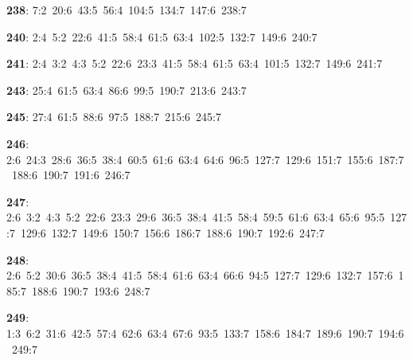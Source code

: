 \noindent \textbf{238}: 7:2\allowbreak\ 20:6\allowbreak\ 43:5\allowbreak\ 56:4\allowbreak\ 104:5\allowbreak\ 134:7\allowbreak\ 147:6\allowbreak\ 238:7\par
\noindent \textbf{240}: 2:4\allowbreak\ 5:2\allowbreak\ 22:6\allowbreak\ 41:5\allowbreak\ 58:4\allowbreak\ 61:5\allowbreak\ 63:4\allowbreak\ 102:5\allowbreak\ 132:7\allowbreak\ 149:6\allowbreak\ 240:7\par
\noindent \textbf{241}: 2:4\allowbreak\ 3:2\allowbreak\ 4:3\allowbreak\ 5:2\allowbreak\ 22:6\allowbreak\ 23:3\allowbreak\ 41:5\allowbreak\ 58:4\allowbreak\ 61:5\allowbreak\ 63:4\allowbreak\ 101:5\allowbreak\ 132:7\allowbreak\ 149:6\allowbreak\ 241:7\par
\noindent \textbf{243}: 25:4\allowbreak\ 61:5\allowbreak\ 63:4\allowbreak\ 86:6\allowbreak\ 99:5\allowbreak\ 190:7\allowbreak\ 213:6\allowbreak\ 243:7\par
\noindent \textbf{245}: 27:4\allowbreak\ 61:5\allowbreak\ 88:6\allowbreak\ 97:5\allowbreak\ 188:7\allowbreak\ 215:6\allowbreak\ 245:7\par
\noindent \textbf{246}: 2:6\allowbreak\ 24:3\allowbreak\ 28:6\allowbreak\ 36:5\allowbreak\ 38:4\allowbreak\ 60:5\allowbreak\ 61:6\allowbreak\ 63:4\allowbreak\ 64:6\allowbreak\ 96:5\allowbreak\ 127:7\allowbreak\ 129:6\allowbreak\ 151:7\allowbreak\ 155:6\allowbreak\ 187:7\allowbreak\ 188:6\allowbreak\ 190:7\allowbreak\ 191:6\allowbreak\ 246:7\par
\noindent \textbf{247}: 2:6\allowbreak\ 3:2\allowbreak\ 4:3\allowbreak\ 5:2\allowbreak\ 22:6\allowbreak\ 23:3\allowbreak\ 29:6\allowbreak\ 36:5\allowbreak\ 38:4\allowbreak\ 41:5\allowbreak\ 58:4\allowbreak\ 59:5\allowbreak\ 61:6\allowbreak\ 63:4\allowbreak\ 65:6\allowbreak\ 95:5\allowbreak\ 127:7\allowbreak\ 129:6\allowbreak\ 132:7\allowbreak\ 149:6\allowbreak\ 150:7\allowbreak\ 156:6\allowbreak\ 186:7\allowbreak\ 188:6\allowbreak\ 190:7\allowbreak\ 192:6\allowbreak\ 247:7\par
\noindent \textbf{248}: 2:6\allowbreak\ 5:2\allowbreak\ 30:6\allowbreak\ 36:5\allowbreak\ 38:4\allowbreak\ 41:5\allowbreak\ 58:4\allowbreak\ 61:6\allowbreak\ 63:4\allowbreak\ 66:6\allowbreak\ 94:5\allowbreak\ 127:7\allowbreak\ 129:6\allowbreak\ 132:7\allowbreak\ 157:6\allowbreak\ 185:7\allowbreak\ 188:6\allowbreak\ 190:7\allowbreak\ 193:6\allowbreak\ 248:7\par
\noindent \textbf{249}: 1:3\allowbreak\ 6:2\allowbreak\ 31:6\allowbreak\ 42:5\allowbreak\ 57:4\allowbreak\ 62:6\allowbreak\ 63:4\allowbreak\ 67:6\allowbreak\ 93:5\allowbreak\ 133:7\allowbreak\ 158:6\allowbreak\ 184:7\allowbreak\ 189:6\allowbreak\ 190:7\allowbreak\ 194:6\allowbreak\ 249:7\par
